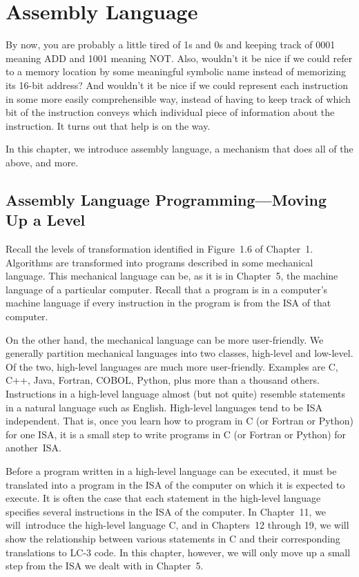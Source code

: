 \documentclass{patt}
\begin{document}

\chapter{Assembly Language}
\label{chapt:assembly}


By now, you are probably a little tired of 1s and 0s and keeping track
of 0001 meaning ADD and 1001 meaning NOT. Also, wouldn't it be nice if
we could refer to a memory location by some meaningful symbolic name
instead of memorizing its 16-bit address? And wouldn't it be nice if
we could represent each instruction in some more easily comprehensible
way, instead of having to keep track of which bit of the instruction
conveys which individual piece of information about the instruction.
It turns out that help is on the way.

In this chapter, we introduce assembly language, a mechanism that does
all of the above, and more.


\section{Assembly Language Programming---Moving Up a Level}

Recall the levels of transformation identified in Figure~1.6 of
Chapter~1. Algorithms are transformed into programs described in some
mechanical language. This mechanical language can be, as it is in
Chapter~5, the machine language of a particular computer. Recall that
a program is in a computer's machine language if every instruction in
the program is from the ISA of that computer.

On the other hand, the mechanical language can be more user-friendly.
We generally partition mechanical languages into two classes,
high-level and low-level. Of the two, high-level languages are much
more user-friendly. Examples are C, C++, Java, Fortran, COBOL, Python,
plus more than a thousand others. Instructions in a high-level
language almost (but not quite) resemble statements in a natural
language such as English. High-level languages tend to be ISA
independent. That is, once you learn how to program in C (or Fortran
or Python) for one ISA, it is a small step to write programs in C (or
Fortran or Python) for another~ISA.

Before a program written in a high-level language can be executed, it
must be translated into a program in the ISA of the computer on which
it is expected to execute. It is often the case that each statement
in the high-level language specifies several instructions in the ISA
of the computer. In Chapter~11, we will~introduce the high-level
language C, and in Chapters~12 through 19, we will show the
relationship between various statements in C and their corresponding
translations to LC-3 code. In this chapter, however, we will only move
up a small step from the ISA we dealt with in Chapter~5.
\end{document}

